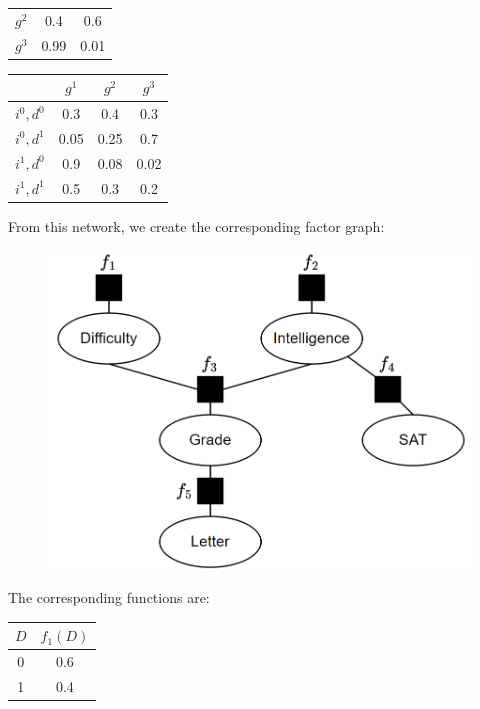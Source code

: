 \begin{example}
\begin{table}[H]
\begin{tabular}{c|cc|}
        \multicolumn{1}{|c|}{$g^2$} & 0.4   & 0.6   \\
        \multicolumn{1}{|c|}{$g^3$} & 0.99  & 0.01  \\ \hline
        \end{tabular}
    \end{table}
    \begin{table}[H]
        \centering
        \begin{tabular}{c|ccc|}
        \cline{2-4}
                                        & $g^1$ & $g^2$ & $g^3$ \\ \hline
        \multicolumn{1}{|c|}{$i^0,d^0$} & 0.3   & 0.4   & 0.3   \\
        \multicolumn{1}{|c|}{$i^0,d^1$} & 0.05  & 0.25  & 0.7   \\
        \multicolumn{1}{|c|}{$i^1,d^0$} & 0.9   & 0.08  & 0.02  \\
        \multicolumn{1}{|c|}{$i^1,d^1$} & 0.5   & 0.3   & 0.2   \\ \hline
        \end{tabular}
    \end{table}
    From this network, we create the corresponding factor graph:
    \begin{figure}[H]
        \centering
        \includegraphics[width=0.5\linewidth]{images/bayfac.png}
    \end{figure}
    The corresponding functions are: 
    \begin{table}[H]
        \centering
        \begin{tabular}{c|c|}
        \cline{2-2}
        $D$                     & $f_1(D)$ \\ \hline
        \multicolumn{1}{|c|}{0} & 0.6      \\
        \multicolumn{1}{|c|}{1} & 0.4      \\ \hline
        \end{tabular}
    \end{table}
    \begin{table}[H]
        \centering

\end{table}
\end{example}
